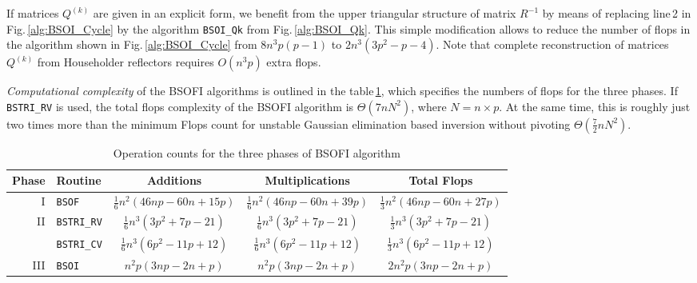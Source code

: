\documentclass{llncs}
\begin{document}
If matrices $Q^{(k)}$ are given in an explicit form,
we benefit from the upper triangular structure of matrix $R^{-1}$
by means of replacing line\,2 %
in Fig.\,\ref{alg:BSOI_Cycle} 
by the algorithm {\tt BSOI\_Qk} from Fig.\,\ref{alg:BSOI_Qk}.
This simple modification allows to reduce the number of flops 
in the algorithm shown in Fig.\,\ref{alg:BSOI_Cycle}
from $8n^3 p (p - 1)$ to $2 n^3 (3 p^2 - p - 4)$.
Note that complete reconstruction of matrices $Q^{(k)}$ 
from Householder reflectors
requires 
$O(n^3 p)$
extra flops.

\textit%
{Computational complexity} \label{sec:flops_count}
of the BSOFI algorithms is outlined 
in the table\,\ref{tab:developed_routines_complexity}, 
which specifies the numbers of flops for the three phases.
If {\tt BSTRI\_RV} is used, 
the total flops complexity %
of the BSOFI algorithm is $\Theta(7 n N^2)$, where $N=n{\times}p$.
At the same time, 
this is roughly just two times more than the 
minimum Flops count for unstable Gaussian elimination based inversion without pivoting $\Theta(\frac{7}{2} n  N^2)$.
\begin{table}[t]%
  \caption[]{Operation counts for the three phases of BSOFI algorithm\footnotemark} 
  \label{tab:developed_routines_complexity}
  \begin{tabular}{r|l|c|c|c}
    \toprule
    Phase & Routine & Additions & Multiplications & Total Flops  \\
    \hline\hline %
    I&{\tt BSOF} & 
    $\frac{1}{6} n^{2} \left(46 n p - 60 n + 15 p\right)$
    & $\frac{1}{6} n^{2} \left(46 n p - 60 n + 39 p\right)$
    & $\frac{1}{3} n^{2} \left(46 n p - 60 n + 27 p\right)$\\
    \hline
    II&{\tt BSTRI\_RV} & 
    $\frac{1}{6} n^3 \left(3 p^{2} + 7 p - 21\right)$
    & $\frac{1}{6} n^3 \left(3 p^{2} + 7 p - 21\right)$
    & $\frac{1}{3} n^3 \left(3 p^{2} + 7 p - 21\right)$\\
    \cline{2-5}
    &{\tt BSTRI\_CV} & 
    $\frac{1}{6} n^3 \left(6 p^{2} - 11 p + 12\right)$
    & $\frac{1}{6} n^3 \left(6 p^{2} - 11 p + 12\right)$
    & $\frac{1}{3} n^3 \left(6 p^{2} - 11 p + 12\right)$\\
    \hline
    III&{\tt BSOI} & 
    $n^{2} p \left(3 n p - 2 n + p\right)$
    & $n^2 p \left(3 n p - 2 n + p\right)$
    & $2 n^2 p \left(3 n p - 2 n + p\right)$\\
    \bottomrule  
  \end{tabular}
\end{table}
\end{document}
